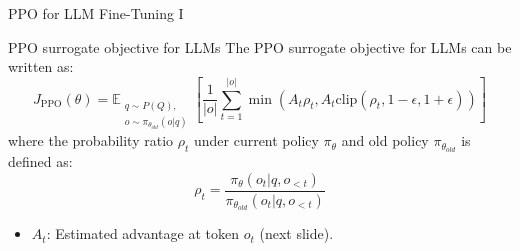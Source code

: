 \documentclass[9pt]{beamer}
\begin{document}
\begin{frame}{PPO for LLM Fine-Tuning I}
  \begin{block}{PPO surrogate objective for LLMs}
  The PPO surrogate objective for LLMs can be written as:
  \begin{equation}
    J_{\text{PPO}}(\theta) = \mathbb{E}_{\substack{q \sim P(Q), \\ o \sim \pi_{\theta_{old}}(o|q)}} \left[ \frac{1}{|o|} \sum_{t=1}^{|o|} \min \left( A_t \rho_{t}, A_t \text{clip}(\rho_{t}, 1-\epsilon, 1+\epsilon) \right) \right]
    \label{eq:ppo_rho}
  \end{equation}
  where the probability ratio $\rho_{t}$ under current policy $\pi_{\theta}$ and old policy $\pi_{\theta_{old}}$ is defined as:
  \begin{equation}
    \rho_{t} = \frac{\pi_\theta(o_t|q, o_{<t})}{\pi_{\theta_{old}}(o_t|q, o_{<t})}
    \label{eq:rho_def}
  \end{equation}
  \end{block}
  \vspace{1em} %

  \begin{itemize}
    \item $A_t$: Estimated advantage at token $o_t$ (next slide).
  \end{itemize}
\end{frame}
\end{document}
